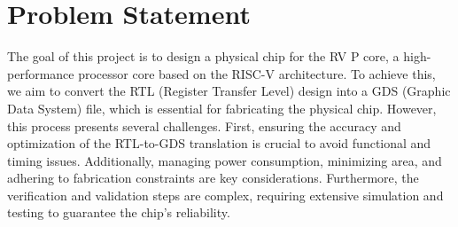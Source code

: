 
\chapter{Problem Statement}
\label{Chapter2}

The goal of this project is to design a physical chip for the RV P core, a high-performance processor core based on the RISC-V architecture. To achieve this, we aim to convert the RTL (Register Transfer Level) design into a GDS (Graphic Data System) file, which is essential for fabricating the physical chip. However, this process presents several challenges. First, ensuring the accuracy and optimization of the RTL-to-GDS translation is crucial to avoid functional and timing issues. Additionally, managing power consumption, minimizing area, and adhering to fabrication constraints are key considerations. Furthermore, the verification and validation steps are complex, requiring extensive simulation and testing to guarantee the chip's reliability.
